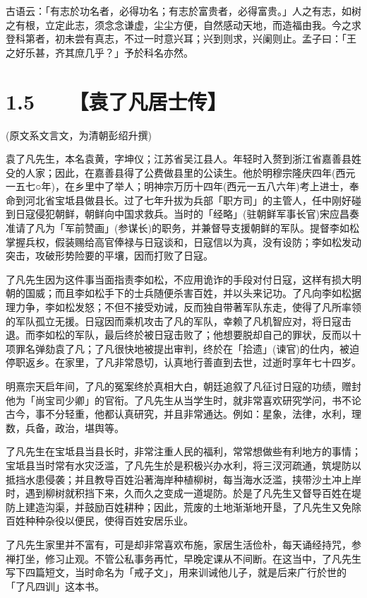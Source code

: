 \documentclass[letterpaper,12pt,english]{sphinxmanual}
\begin{document}
古语云：「有志於功名者，必得功名；有志於富贵者，必得富贵。」人之有志，如树之有根，立定此志，须念念谦虚，尘尘方便，自然感动天地，而造福由我。今之求登科第者，初未尝有真志，不过一时意兴耳；兴到则求，兴阑则止。孟子曰：「王之好乐甚，齐其庶几乎？」予於科名亦然。


\section{1.5   【袁了凡居士传】}
\label{\detokenize{p00_u5176_u5b83/_u8881_u4e86_u51e1-_u4e86_u51e1_u56db_u8bad:id7}}
(原文系文言文，为清朝彭绍升撰)

袁了凡先生，本名袁黄，字坤仪；江苏省吴江县人。年轻时入赘到浙江省嘉善县姓殳的人家；因此，在嘉善县得了公费做县里的公读生。他於明穆宗隆庆四年(西元一五七○年)，在乡里中了举人；明神宗万历十四年(西元一五八六年)考上进士，奉命到河北省宝坻县做县长。过了七年升拔为兵部「职方司」的主管人，任中刚好碰到日寇侵犯朝鲜，朝鲜向中国求救兵。当时的「经略」(驻朝鲜军事长官)宋应昌奏准请了凡为「军前赞画」(参谋长)的职务，并兼督导支援朝鲜的军队。提督李如松掌握兵权，假装赐给高官俸禄与日寇谈和，日寇信以为真，没有设防；李如松发动突击，攻破形势险要的平壤，因而打败了日寇。

了凡先生因为这件事当面指责李如松，不应用诡诈的手段对付日寇，这样有损大明朝的国威；而且李如松手下的士兵随便杀害百姓，并以头来记功。了凡向李如松据理力争，李如松发怒；不但不接受劝诫，反而独自带著军队东走，使得了凡所率领的军队孤立无援。日寇因而乘机攻击了凡的军队，幸赖了凡机智应对，将日寇击退。而李如松的军队，最后终於被日寇击败了；他想要脱却自己的罪状，反而以十项罪名弹劾袁了凡；了凡很快地被提出审判，终於在「拾遗」(谏官)的仕内，被迫停职返乡。在家里，了凡非常恳切，认真地行善直到去世，过逝时享年七十四岁。

明熹宗天启年间，了凡的冤案终於真相大白，朝廷追叙了凡征讨日寇的功绩，赠封他为「尚宝司少卿」的官衔。了凡先生从当学生时，就非常喜欢研究学问，书不论古今，事不分轻重，他都认真研究，并且非常通达。例如：星象，法律，水利，理数，兵备，政治，堪舆等。

了凡先生在宝坻县当县长时，非常注重人民的福利，常常想做些有利地方的事情；宝坻县当时常有水灾泛滥，了凡先生於是积极兴办水利，将三汊河疏通，筑堤防以抵挡水患侵袭；并且教导百姓沿著海岸种植柳树，每当海水泛滥，挟带沙土冲上岸时，遇到柳树就积挡下来，久而久之变成一道堤防。於是了凡先生又督导百姓在堤防上建造沟渠，并鼓励百姓耕种；因此，荒废的土地渐渐地开垦，了凡先生又免除百姓种种杂役以便民，使得百姓安居乐业。

了凡先生家里并不富有，可是却非常喜欢布施，家居生活俭朴，每天诵经持咒，参禅打坐，修习止观。不管公私事务再忙，早晚定课从不间断。在这当中，了凡先生写下四篇短文，当时命名为「戒子文」，用来训诫他儿子，就是后来广行於世的「了凡四训」这本书。
\end{document}
